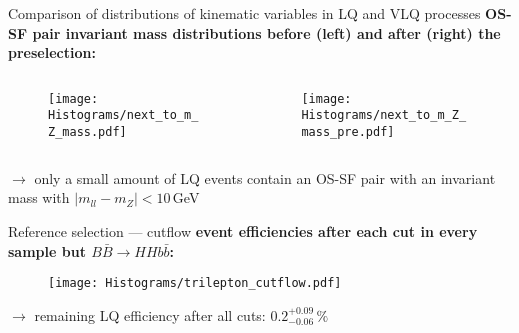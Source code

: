 \documentclass[aspectratio=1610, professionalfonts, 9pt]{beamer}
\begin{document}
\begin{frame}{Comparison of distributions of kinematic variables in LQ and VLQ processes}
    \textbf{OS-SF pair invariant mass distributions before (left) and after (right) the preselection:}
    \begin{columns}
        \begin{column}{0.5\textwidth}
            \begin{figure}
                \centering
                \texttt{[image: Histograms/next\_to\_m\_Z\_mass.pdf]}
                \label{fig:ll_m}
            \end{figure}
        \end{column}
        \begin{column}{0.5\textwidth}
            \begin{figure}
                \centering
                \texttt{[image: Histograms/next\_to\_m\_Z\_mass\_pre.pdf]}
                \label{fig:ll_m_pre}
            \end{figure}
        \end{column}
    \end{columns}
    \(\rightarrow\) only a small amount of LQ events contain an OS-SF pair with an invariant mass with \(|m_{ll}-m_{Z}|<10\,\)GeV
\end{frame}


\begin{frame}{Reference selection --- cutflow}
  \textbf{event efficiencies after each cut in every sample but \(B\bar{B} \rightarrow HH b\bar{b}\):}
    \begin{figure}
        \centering
        \texttt{[image: Histograms/trilepton\_cutflow.pdf]}
        \label{fig:triflow_old}
    \end{figure}
    \(\longrightarrow\) remaining LQ efficiency after all cuts: \(0.2_{-0.06}^{+0.09} \, \%\)
\end{frame}
\end{document}

